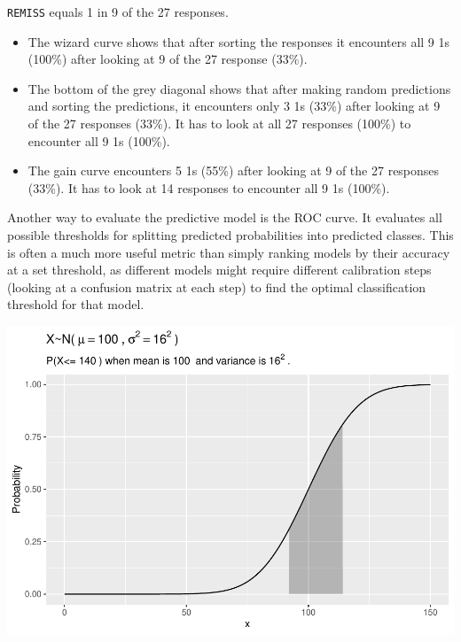 \documentclass[
]{book}
\newenvironment{Shaded}{\begin{snugshade}}{\end{snugshade}}
\newcommand{\DataTypeTok}[1]{\textcolor[rgb]{0.13,0.29,0.53}{#1}}
\newcommand{\KeywordTok}[1]{\textcolor[rgb]{0.13,0.29,0.53}{\textbf{#1}}}
\newcommand{\NormalTok}[1]{#1}
\newcommand{\OperatorTok}[1]{\textcolor[rgb]{0.81,0.36,0.00}{\textbf{#1}}}
\newcommand{\OtherTok}[1]{\textcolor[rgb]{0.56,0.35,0.01}{#1}}
\providecommand{\tightlist}{%
  \setlength{\itemsep}{0pt}\setlength{\parskip}{0pt}}
\begin{document}
\texttt{REMISS} equals 1 in 9 of the 27 responses.

\begin{itemize}
\tightlist
\item
  The wizard curve shows that after sorting the responses it encounters all 9 1s (100\%) after looking at 9 of the 27 response (33\%).\\
\item
  The bottom of the grey diagonal shows that after making random predictions and sorting the predictions, it encounters only 3 1s (33\%) after looking at 9 of the 27 responses (33\%). It has to look at all 27 responses (100\%) to encounter all 9 1s (100\%).\\
\item
  The gain curve encounters 5 1s (55\%) after looking at 9 of the 27 responses (33\%). It has to look at 14 responses to encounter all 9 1s (100\%).
\end{itemize}

Another way to evaluate the predictive model is the ROC curve. It evaluates all possible thresholds for splitting predicted probabilities into predicted classes. This is often a much more useful metric than simply ranking models by their accuracy at a set threshold, as different models might require different calibration steps (looking at a confusion matrix at each step) to find the optimal classification threshold for that model.

\begin{Shaded}
\end{Shaded}

\includegraphics{data-sci_files/figure-latex/unnamed-chunk-15-1.pdf}
\end{document}

